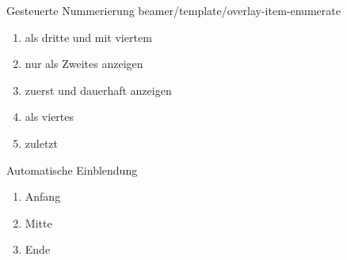 \begin{frame}[c]{}
  Gesteuerte Nummerierung beamer/template/overlay-item-enumerate
  \begin{enumerate}
    \item<3-4> als dritte und mit viertem
    \item<2>   nur als Zweites anzeigen
    \item<1->  zuerst und dauerhaft anzeigen
    \item<4>   als viertes
    \item<5->  zuletzt
  \end{enumerate}
  Automatische Einblendung
  \begin{enumerate}[<+->]
    \item Anfang
    \item Mitte
    \item Ende
  \end{enumerate}
\end{frame}

